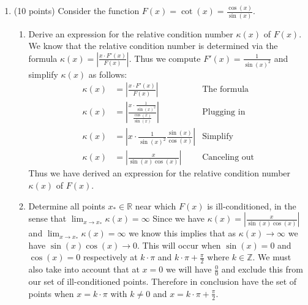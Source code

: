 \documentclass{article}
\begin{document}
\begin{enumerate}
    \newpage
    \item (10 points) Consider the function $F(x) = \cot(x) = \frac{\cos(x)}{\sin(x)}$.
    \begin{enumerate}
        \item Derive an expression for the relative condition number $\kappa(x)$ of $F(x)$.
        \newline
        \newline
        We know that the relative condition number is determined via the formula $\kappa(x) = \left|\frac{x\cdot F'(x)}{F(x)}\right|$. Thus we compute $F'(x) = \frac{1}{\sin(x)^2}$ and simplify $\kappa(x)$ as follows:
        \begin{align*}
            \kappa(x) &= \left|\frac{x\cdot F'(x)}{F(x)}\right| & \mbox{The formula}\\
            \kappa(x)&= \left|\frac{x\cdot \frac{1}{\sin(x)^2}}{\frac{\cos(x)}{\sin(x)}}\right|&  \mbox{Plugging in}\\
            \kappa(x) &= \left|x\cdot \frac{1}{\sin(x)^2} \frac{\sin(x)}{\cos(x)}\right| &  \mbox{Simplify}\\
            \kappa(x) &= \left|\frac{x}{\sin(x)\cos(x)}\right| &  \mbox{Canceling out}
        \end{align*}
        Thus we have derived an expression for the relative condition number $\kappa(x)$ of $F(x)$.
        \item Determine all points $x_* \in \mathbb{R}$ near which $F(x)$ is ill-conditioned, in the sense that $\lim_{x\to x_*} \kappa(x) = \infty$
        \newline
        \newline
        Since we have $\kappa(x) = \left|\frac{x}{\sin(x)\cos(x)}\right|$ and $\lim_{x\to x_*} \kappa(x) = \infty$ we know this implies that as $\kappa(x) \to \infty$ we have $\sin(x)\cos(x) \to 0$. This will occur when $\sin(x) = 0$ and $\cos(x) = 0$ respectively at $k\cdot\pi$ and $k\cdot\pi + \frac{\pi}{2}$ where $k\in\mathbb{Z}$. We must also take into account that at $x = 0$ we will have $\frac{0}{0}$ and exclude this from our set of ill-conditioned points. Therefore in conclusion have the set of points when $x = k\cdot\pi$ with $k \neq 0$ and $x = k\cdot\pi + \frac{\pi}{2}$.
    \end{enumerate}
    

\end{enumerate}
\end{document}

